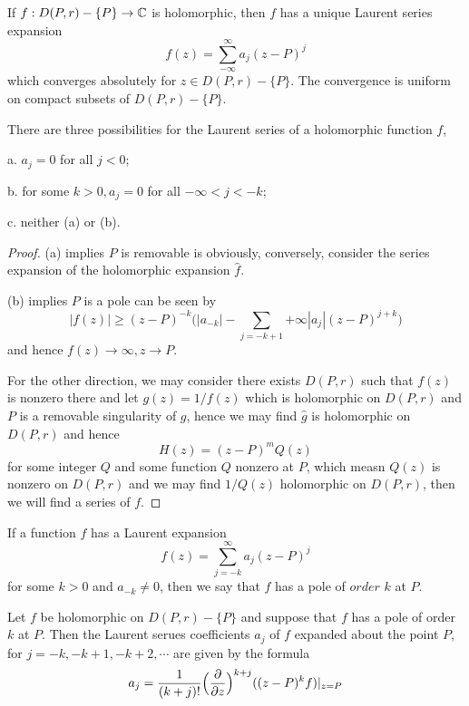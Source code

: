 \begin{proposition}
    If $f:D(P,r)-\{P\}\to\mathbb{C}$ is holomorphic, then $f$ has a unique Laurent series expansion
    \[f(z) = \sum_{-\infty}^{\infty}a_j(z-P)^j\]
    which converges absolutely for $z\in D(P,r)-\{P\}$. The convergence is uniform on compact subsets of $D(P,r)-\{P\}$.
\end{proposition}

\begin{proposition}
    There are three possibilities for the Laurent series of a holomorphic function $f$,\par
    a. $a_j = 0$ for all $j<0$;\par
    b. for some $k>0,a_j=0$ for all $-\infty < j < -k$;\par
    c. neither (a) or (b).
\end{proposition}
\begin{proof}\par
    (a) implies $P$ is removable is obviously, conversely, consider the series expansion of  the holomorphic expansion $\hat{f}$.\par
    (b) implies $P$ is a pole can be seen by
    \[
    |f(z)| \geq (z-P)^{-k}\Big(|a_{-k}| - \sum\limits_{j=-k+1}{+\infty} |a_j|(z-P)^{j+k}\Big)
    \]
    and hence $f(z)\to \infty, z\to P$.\par
    For the other direction, we may consider there exists $D(P,r)$ such that $f(z)$ is nonzero there and let $g(z) = 1/f(z)$ which is holomorphic on $D(P,r)$ and $P$ is a removable singularity of $g$, hence we may find $\hat{g}$ is holomorphic on $D(P,r)$ and hence
    \[
    H(z) = (z-P)^mQ(z)
    \]
    for some integer $Q$ and some function $Q$ nonzero at $P$, which measn $Q(z)$ is nonzero on $D(P,r)$ and we may find $1/Q(z)$ holomorphic on $D(P,r)$, then we will find a series of $f$.
\end{proof}

\begin{definition}
    If a function $f$ has a Laurent expansion
    \[f(z) = \sum_{j=-k}^{\infty}a_j(z-P)^j\]
    for some $k>0$ and $a_{-k}\neq 0$, then we say that $f$ has a pole of $order$ $k$ at $P$.
\end{definition}

\begin{proposition}
    Let $f$ be holomorphic on $D(P,r)-\{P\}$ and suppose that $f$ has a pole of order $k$ at $P$. Then the Laurent serues coefficients $a_j$ of $f$ expanded about the point $P$, for $j=-k,-k+1,-k+2,\cdots$ are given by the formula
    \[
    a_j = \dfrac{1}{(k+j)!}\Big(\dfrac{\partial}{\partial z}\Big)^{k+j}((z-P)^k f)|_{z=P}
    \]
\end{proposition}

